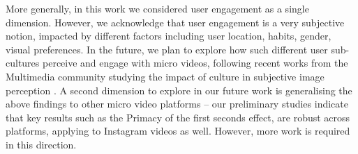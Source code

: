 More generally, in this work we considered user engagement as a single dimension. However, we acknowledge that user engagement is a very subjective notion, impacted by different factors including user location, habits, gender, visual preferences. In the future, we plan to explore how such different user sub-cultures perceive and engage with micro videos, following recent works from the Multimedia community studying the impact of culture in subjective image perception \cite{jou2015visual}. A second dimension to explore in our future work is generalising the above findings to other micro video platforms -- our preliminary studies indicate that key results such as the Primacy of the first seconds effect, are robust across platforms, applying to Instagram videos as well. However, more work is required in this direction.


%
%
%
%
%
% 
